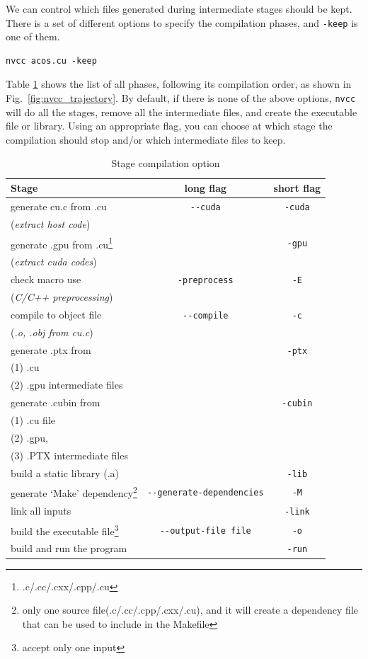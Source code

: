 We can control which files generated during intermediate stages should be kept.
There is a set of different options to specify the compilation phases, and
\verb!-keep! is one of them.  
\begin{verbatim}
nvcc acos.cu -keep
\end{verbatim}

Table \ref{tab:stagecompilation} shows the list of all phases, following its
compilation order, as shown in Fig.~\ref{fig:nvcc_trajectory}. By default, if
there is none of the above options, \verb!nvcc! will do all the stages, remove
all the intermediate files, and create the executable file or library. Using an
appropriate flag, you can choose at which stage the compilation should stop
and/or which intermediate files to keep.


\begin{table}[hbt]
\begin{center}
\caption{Stage compilation option}
\begin{tabular}{lcc} 
  \hline
  Stage & long flag & short flag \\ 
  \hline\hline
  generate cu.c from .cu  & \verb!--cuda! & \verb!-cuda! \\
  ({\it extract host code}) & & \\
  generate .gpu from .cu\footnote{.c/.cc/.cxx/.cpp/.cu}  & &
  \verb!-gpu! \\
  ({\it extract cuda codes}) & & \\
  check macro use & \verb!-preprocess! & \verb!-E! \\
  ({\it C/C++ preprocessing}) & & \\
  compile to object file & \verb!--compile! & \verb!-c! \\
  ({\it .o, .obj from cu.c}) & & \\
  generate .ptx from  & & \verb!-ptx! \\
  (1) .cu  & & \\
  (2) .gpu intermediate files & & \\
  generate .cubin from  &  & \verb!-cubin! \\
  (1) .cu file & & \\
  (2) .gpu,  & & \\
  (3) .PTX intermediate files & & \\
  build a static library (.a) & & \verb!-lib! \\
  generate `Make' dependency\footnote{only one source
    file(.c/.cc/.cpp/.cxx/.cu), and it will create a dependency
    file that can be used to include in the Makefile} &
  \verb!--generate-dependencies! & \verb!-M! \\
  link all inputs & & \verb!-link! \\
  build the executable file\footnote{accept only one input} &
  \verb!--output-file file! & \verb!-o! \\
  build and run the program & & \verb!-run! \\
  \hline\hline
\end{tabular}
\end{center}
\label{tab:stagecompilation}
\end{table}


